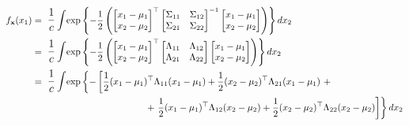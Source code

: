 \documentclass[twoside,11pt]{homework}
\DeclarePairedDelimiter{\2norm}{\lVert}{\rVert^2_2}
\newcommand{\1}[1]{\mathds{1}\left[#1\right]}
\begin{document}
\begin{align*}
f_{\textbf{x}}(x_1) & = \ \mathlarger{\frac{1}{c} \int} \text{exp} \left\lbrace-\frac{1}{2}\left(\begin{bmatrix} x_1 - \mu_1 \\ x_2 - \mu_2 \end{bmatrix}^{\top} \begin{bmatrix} \Sigma_{11} & \Sigma_{12} \\ \Sigma_{21} & \Sigma_{22} \end{bmatrix}^{-1} \begin{bmatrix} x_1 - \mu_1 \\ x_2 - \mu_2 \end{bmatrix}\right) \right\rbrace dx_2 \\
& = \ \mathlarger{\frac{1}{c} \int} \text{exp} \left\lbrace-\frac{1}{2}\left(\begin{bmatrix} x_1 - \mu_1 \\ x_2 - \mu_2 \end{bmatrix}^{\top} \begin{bmatrix} \Lambda_{11} & \Lambda_{12} \\ \Lambda_{21} & \Lambda_{22} \end{bmatrix} \begin{bmatrix} x_1 - \mu_1 \\ x_2 - \mu_2 \end{bmatrix}\right) \right\rbrace dx_2 \\
& = \ \mathlarger{\frac{1}{c} \int} \text{exp} \left\lbrace-\left[ \frac{1}{2}(x_1 - \mu_1)^{\top}\Lambda_{11}(x_1-\mu_1)  +  \frac{1}{2}(x_2 - \mu_2)^{\top}\Lambda_{21}(x_1-\mu_1) \ + \right. \right. \\
& \ \ \ \ \ \ \ \ \ \ \ \ \ \ \ \ \ \ \ \ \ \ \ \ \ \ \ \ \ \ \ \ \ \ \ \ \left. \left. + \ \frac{1}{2}(x_1 - \mu_1)^{\top}\Lambda_{12}(x_2-\mu_2) + \frac{1}{2}(x_2 - \mu_2)^{\top}\Lambda_{22}(x_2-\mu_2)\right] \right\rbrace dx_2 \\
\end{align*}
\end{document}
